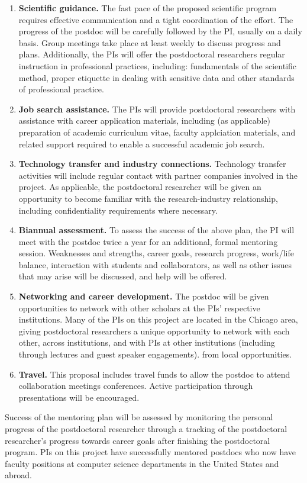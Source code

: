 \begin{enumerate}
    \item {\bf Scientific guidance.} The fast pace of the proposed scientific
        program requires effective communication and a tight coordination of
        the effort.  The progress of the postdoc will be carefully followed by
        the PI, usually on a daily basis.  Group meetings take place at least
        weekly to discuss progress and plans. Additionally, the PIs will offer
        the postdoctoral researchers regular instruction in professional
        practices, including: fundamentals of the scientific method, proper
        etiquette in dealing with sensitive data and other standards of
        professional practice.

    \item {\bf Job search assistance.} The PIs will provide postdoctoral
        researchers with assistance with career application materials, including (as
        applicable) preparation of academic curriculum vitae, faculty
        applciation materials, and related support required to enable a
        successful academic job search.

    \item {\bf Technology transfer and industry connections.} Technology
        transfer activities will include regular contact with partner
        companies involved in the project.  As applicable, the postdoctoral
        researcher will be given an opportunity to become familiar with the
        research-industry relationship, including confidentiality requirements
        where necessary.

    \item {\bf Biannual assessment.} To assess the success of the above plan,
        the PI will meet with the postdoc twice a year for an additional,
        formal mentoring session. Weaknesses and strengths, career goals, research
        progress, work/life balance, interaction with students and collaborators, as
        well as other issues that may arise will be discussed, and help will be
        offered.

    \item {\bf Networking and career development.} The postdoc will be given
        opportunities to network with other scholars at the PIs' respective
        institutions. Many of the PIs on this project are located in the Chicago area,
        giving postdoctoral researchers a unique opportunity to network with each
        other, across institutions, and with PIs at other institutions (including
        through lectures and guest speaker engagements).
from local opportunities.

\item {\bf Travel.} This proposal includes travel funds
    to allow the postdoc to attend collaboration meetings conferences.  Active
participation through 
presentations will be encouraged.
\end{enumerate}
\noindent
Success of the mentoring plan will be assessed by monitoring the
personal progress of the postdoctoral researcher through a tracking of
the postdoctoral researcher's progress towards career goals
after finishing the postdoctoral program.
PIs on this project have successfully mentored postdocs who now have faculty
positions at computer science departments in the United States and abroad.
